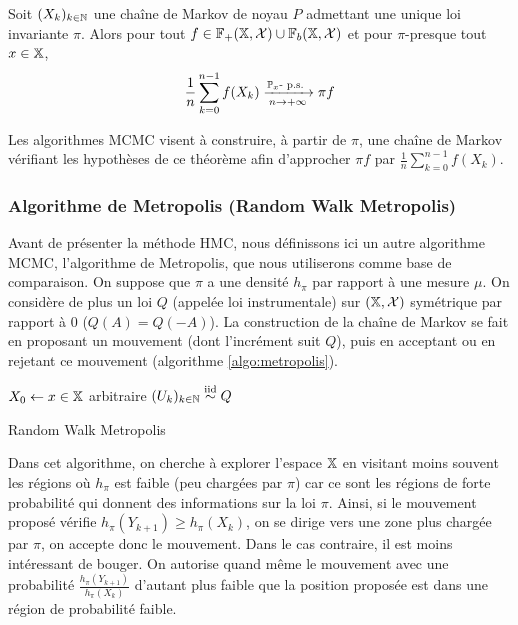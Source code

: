 \documentclass[10pt,a4paper]{article}
\begin{document}
\begin{Thm}\label{thm:ergodic}
	Soit $(X_k)_{k \in \mathbb{N}}$ une chaîne de Markov de noyau $P$ admettant une unique loi invariante $\pi$. Alors pour tout $f \in \mathbb{F}_+(\mathbb{X}, \mathcal{X}) \cup \mathbb{F}_b(\mathbb{X}, \mathcal{X})$ et pour $\pi$-presque tout $x \in \mathbb{X}$,
	$$\frac{1}{n} \sum_{k=0}^{n-1} f(X_k) \xrightarrow[n \to +\infty]{\PP_x\text{-}\ps} \pi f$$
\end{Thm}

Les algorithmes MCMC visent à construire, à partir de $\pi$, une chaîne de Markov vérifiant les hypothèses de ce théorème afin d'approcher $\pi f$ par $\frac{1}{n} \sum_{k=0}^{n-1} f(X_k)$.

\subsubsection{Algorithme de Metropolis (Random Walk Metropolis)}

Avant de présenter la méthode HMC, nous définissons ici un autre algorithme MCMC, l'algorithme de Metropolis, que nous utiliserons comme base de comparaison.
On suppose que $\pi$ a une densité $h_\pi$ par rapport à une mesure $\mu$. On considère de plus un loi $Q$ (appelée loi instrumentale) sur $(\mathbb{X}, \mathcal{X})$ symétrique par rapport à $0$ ($Q(A) = Q(-A)$). La construction de la chaîne de Markov se fait en proposant un mouvement (dont l'incrément suit $Q$), puis en acceptant ou en rejetant ce mouvement (algorithme \ref{algo:metropolis}).

\begin{center}
	\begin{algorithm}[H]
		$X_0 \leftarrow x \in \mathbb{X}$ arbitraire\;
		$(U_k)_{k \in \mathbb{N}} \stackrel{\rm iid}{\sim} Q$ \;
		\caption{Random Walk Metropolis}
		\label{algo:metropolis}
	\end{algorithm}
\end{center}

Dans cet algorithme, on cherche à explorer l'espace $\mathbb{X}$ en visitant moins souvent les régions où $h_\pi$ est faible (peu chargées par $\pi$) car ce sont les régions de forte probabilité qui donnent des informations sur la loi $\pi$. Ainsi, si le mouvement proposé vérifie $h_\pi(Y_{k+1}) \geq h_\pi(X_k)$, on se dirige vers une zone plus chargée par $\pi$, on accepte donc le mouvement. Dans le cas contraire, il est moins intéressant de bouger. On autorise quand même le mouvement avec une probabilité $\frac{h_\pi(Y_{k+1})}{h_\pi(X_k)}$ d'autant plus faible que la position proposée est dans une région de probabilité faible.
\end{document}
